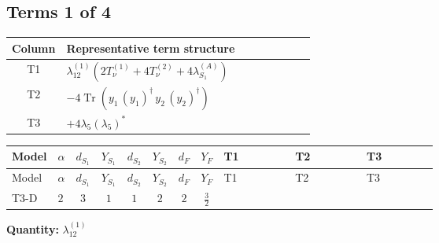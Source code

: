 \documentclass[8pt]{article}
\begin{document}
\begin{landscape}
\subsection*{Terms 1 of 4}
\begin{center}
\begin{tabular}{@{}c >{\raggedright\arraybackslash}p{0.82\linewidth}@{}}
\toprule
Column & Representative term structure \\
\midrule
T1 & \(\displaystyle {\lambda_{12}^{(1)}} (2 T_{\nu}^{(1)}+4 T_{\nu}^{(2)}+4 {\lambda_{S_1}^{(A)}})\) \\
\midrule
T2 & \(\displaystyle -4 \operatorname{Tr}\!\left({y_1}\,\left({y_1}\right)^{\dagger}\,{y_2}\,\left({y_2}\right)^{\dagger}\right)\) \\
\midrule
T3 & \(\displaystyle +4 {\lambda_5} \left({\lambda_5}\right)^{*}\) \\
\midrule
\bottomrule
\end{tabular}
\end{center}
\smallskip
\tiny
\begin{longtable}{@{}llcccccc >{\raggedright\arraybackslash}p{0.21\linewidth} >{\raggedright\arraybackslash}p{0.21\linewidth} >{\raggedright\arraybackslash}p{0.21\linewidth}@{}}
\toprule
Model & $\alpha$ & $d_{S_1}$ & $Y_{S_1}$ & $d_{S_2}$ & $Y_{S_2}$ & $d_F$ & $Y_F$ & T1 & T2 & T3 \\
\midrule
\endfirsthead
\toprule
Model & $\alpha$ & $d_{S_1}$ & $Y_{S_1}$ & $d_{S_2}$ & $Y_{S_2}$ & $d_F$ & $Y_F$ & T1 & T2 & T3 \\
\midrule
\endhead
T3-D & $2$ & $3$ & $1$ & $1$ & $2$ & $2$ & $\frac{3}{2}$ & \scriptsize\adjustbox{max width=\linewidth}{$\begin{gathered} {\lambda_{12}^{(1)}} (2 T_{\nu}^{(1)}+4 T_{\nu}^{(2)}+4 {\lambda_{S_1}^{(A)}})\end{gathered}$} & \scriptsize\adjustbox{max width=\linewidth}{$\begin{gathered} -4 \operatorname{Tr}\!\left({y_1}\,\left({y_1}\right)^{\dagger}\,{y_2}\,\left({y_2}\right)^{\dagger}\right)\end{gathered}$} & \scriptsize\adjustbox{max width=\linewidth}{$\begin{gathered} +4 {\lambda_5} \left({\lambda_5}\right)^{*}\end{gathered}$} \\
\midrule
\bottomrule
\end{longtable}
\clearpage
\noindent\textbf{Quantity: }$\lambda_{12}^{(1)}$\par\smallskip

\end{landscape}
\end{document}
